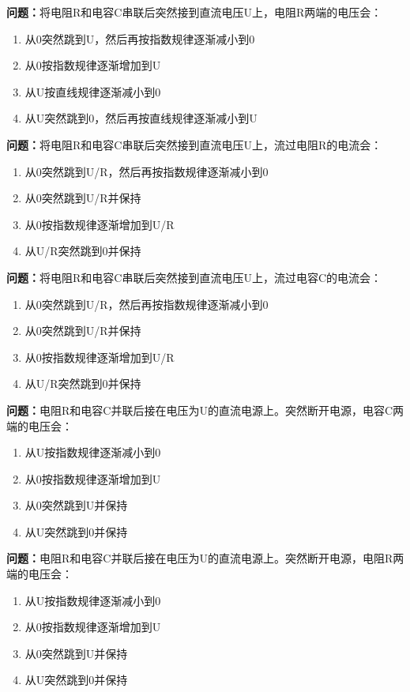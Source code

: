 \bigskip


\noindent\textbf{问题：}将电阻R和电容C串联后突然接到直流电压U上，电阻R两端的电压会：
\begin{enumerate}[label=\Alph*), leftmargin=3em]
\item 从0突然跳到U，然后再按指数规律逐渐减小到0
\item 从0按指数规律逐渐增加到U
\item 从U按直线规律逐渐减小到0
\item 从U突然跳到0，然后再按直线规律逐渐减小到U
\end{enumerate}

\bigskip


\noindent\textbf{问题：}将电阻R和电容C串联后突然接到直流电压U上，流过电阻R的电流会：
\begin{enumerate}[label=\Alph*), leftmargin=3em]
\item 从0突然跳到U/R，然后再按指数规律逐渐减小到0
\item 从0突然跳到U/R并保持
\item 从0按指数规律逐渐增加到U/R
\item 从U/R突然跳到0并保持
\end{enumerate}

\bigskip


\noindent\textbf{问题：}将电阻R和电容C串联后突然接到直流电压U上，流过电容C的电流会：
\begin{enumerate}[label=\Alph*), leftmargin=3em]
\item 从0突然跳到U/R，然后再按指数规律逐渐减小到0
\item 从0突然跳到U/R并保持
\item 从0按指数规律逐渐增加到U/R
\item 从U/R突然跳到0并保持
\end{enumerate}

\bigskip


\noindent\textbf{问题：}电阻R和电容C并联后接在电压为U的直流电源上。突然断开电源，电容C两端的电压会：
\begin{enumerate}[label=\Alph*), leftmargin=3em]
\item 从U按指数规律逐渐减小到0
\item 从0按指数规律逐渐增加到U
\item 从0突然跳到U并保持
\item 从U突然跳到0并保持
\end{enumerate}

\bigskip


\noindent\textbf{问题：}电阻R和电容C并联后接在电压为U的直流电源上。突然断开电源，电阻R两端的电压会：
\begin{enumerate}[label=\Alph*), leftmargin=3em]
\item 从U按指数规律逐渐减小到0
\item 从0按指数规律逐渐增加到U
\item 从0突然跳到U并保持
\item 从U突然跳到0并保持
\end{enumerate}


